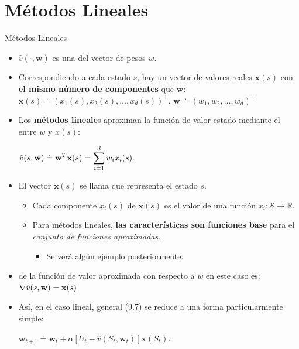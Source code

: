 \documentclass[10pt, envcountsect, handout, aspectratio=1610, hyperref={hypertexnames=true}]{beamer}
\begin{document}
\section{Métodos Lineales}

\begin{frame}{Métodos Lineales}
	\begin{itemize}
		\item $\hat{v}(\cdot, \mathbf{w})$ es una  del vector de pesos $w$.
		
		\item Correspondiendo a cada estado $s$, hay un vector de valores reales $\mathbf{x}(s)$ con \textbf{el mismo número de componentes} que $\mathbf{w}$: $ \mathbf{x}(s) \doteq (x_1(s), x_2(s), \dots, x_d(s))^\top $, $ \mathbf{w} \doteq (w_1, w_2, \dots, w_d)^\top $
		
		\item Los\textbf{ métodos lineale}s aproximan la función de valor-estado mediante el  entre $w$ y $x(s)$:
		
		\centerline{\large$\displaystyle \hat{v}(s, \mathbf{w}) \doteq \mathbf{w}^T \mathbf{x}(s) = \sum_{i=1}^{d} w_i x_i(s).$}
		
		\item El vector $\mathbf{x}(s)$ se llama  que representa el estado $s$.
		\begin{itemize}
			\item Cada componente $x_i(s)$ de $\mathbf{x}(s)$ es el valor de una función $x_i : \mathcal{S} \to \mathbb{R}$.
		
			\item Para métodos lineales, \textbf{las características son funciones base} para el \textit{conjunto de funciones aproximadas}.
				\begin{itemize}
					\item Se verá algún ejemplo posteriormente.
				\end{itemize}
		\end{itemize}

	\item {} de la función de valor aproximada con respecto a $w$ en este caso es:
	{\large$\displaystyle
	\nabla \hat{v}(s, \mathbf{w}) = \mathbf{x}(s)
	$}
	
	\item Así, en el caso lineal,  general (9.7) se reduce a una forma particularmente simple:
	\centerline{\large$
	\mathbf{w}_{t+1} \doteq \mathbf{w}_t + \alpha \left[ U_t - \hat{v}(S_t, \mathbf{w}_t) \right] \mathbf{x}(S_t).
	$}
	

\end{itemize}
\end{frame}
\end{document}
